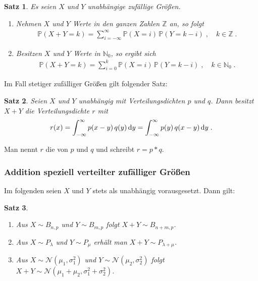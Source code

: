 \documentclass[ngerman,draft,parskip=half,twoside]{scrartcl}
\newtheorem{thm}{Satz}[section]
\newcommand*{\highl}[2][]{\textbf{\boldmath{#2}}%
  \ifthenelse{\equal{#1}{}}{\index{#2}}{\index{#1}}%
}
\newcommand*{\N}{\mathbb{N}}      %
\newcommand*{\Z}{\mathbb{Z}}      %
\newcommand*{\WKM}{\mathbb{P}}      %
\newcommand*{\NormVert}{\mathcal{N}} %
\newcommand*{\diff}[1]{%
  \mathop{\mathrm{\mathstrut d}}%
  \ifx#1(\else%
  \ifx#1[\else%
  \ifx#1\{\else%
    \!%
  \fi\fi\fi#1%
}
\begin{document}
\begin{thm}
  Es seien $X$ und $Y$ unabhängige zufällige Größen.
  \begin{enumerate}
   \item Nehmen $X$ und $Y$ Werte in den ganzen Zahlen $\Z$ an, so folgt
    \begin{gather*}
      \WKM(X+Y=k)
         =\sum_{i=-\infty}^\infty\WKM(X=i)\,\WKM(Y=k-i)\;,\quad k\in \Z\;.
    \end{gather*}

   \item Besitzen $X$ und $Y$ Werte in $\N_0$, so ergibt sich
    \begin{gather*}
      \WKM(X+Y=k)=\sum_{i=0}^k\WKM(X=i)\,\WKM(Y=k-i)\;,\quad k\in \N_0\;.
    \end{gather*}
\end{enumerate}
\end{thm}

Im Fall stetiger zufälliger Größen gilt folgender Satz:
\begin{thm}
  Seien $X$ und $Y$ unabhängig mit Verteilungsdichten $p$ und $q$. Dann besitzt
  $X+Y$ die Verteilungsdichte $r$ mit
  \begin{gather*}
    r(x)
       =\int_{-\infty}^\infty p(x-y)\,q(y)\diff{y}
       = \int_{-\infty}^\infty p(y)\,q(x-y)\diff{y} \;.
  \end{gather*}
\end{thm}

Man nennt $r$ die \highl{Faltung} von $p$ und $q$ und schreibt $r=p*q$.

\subsubsection{Addition speziell verteilter zufälliger Größen}

Im folgenden seien $X$ und $Y$ stets als unabhängig vorausgesetzt. Dann gilt:
\begin{thm}~
  \begin{enumerate}[label=(\alph*)]
   \item Aus $X\sim B_{n,p}$ und $Y\sim B_{m,p}$ folgt $X+Y\sim B_{n+m,p}$.

   \item Aus $X\sim P_\lambda$ und $Y\sim P_\mu$ erhält man $X+Y\sim
    P_{\lambda+\mu}$.

   \item Aus $X\sim\NormVert(\mu_1,\sigma_1^2)$ und
    $Y\sim\NormVert(\mu_2,\sigma_2^2)$ folgt $X+Y\sim
    \NormVert(\mu_1+\mu_2,\sigma_1^2+\sigma_2^2)$.
  \end{enumerate}
\end{thm}
\end{document}

